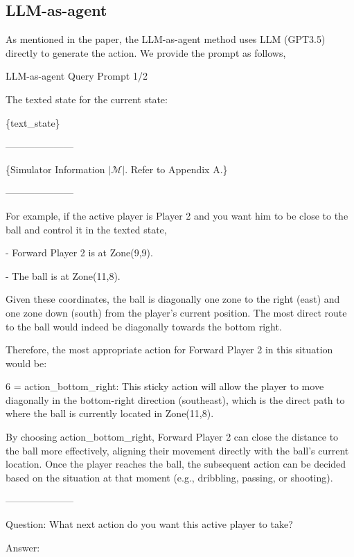\subsection{LLM-as-agent}
As mentioned in the paper, the LLM-as-agent method uses LLM (GPT3.5) directly to generate the action. We provide the prompt as follows,
\begin{gbox}{LLM-as-agent Query Prompt 1/2}

The texted state for the current state:

\{text\_state\}



---------------------



\{Simulator Information $|\mathcal{M}|$. Refer to Appendix A.\}




---------------------

\hspace{5mm}


For example, if the active player is Player 2 and you want him to be close to the ball and control it in the texted state, 

\hspace{5mm}

- Forward Player 2 is at Zone(9,9).


- The ball is at Zone(11,8).

\hspace{5mm}

Given these coordinates, the ball is diagonally one zone to the right 
(east) and one zone down (south) from the player's current position. 
The most direct route to the ball would indeed 
be diagonally towards the bottom right. 

\hspace{5mm}

Therefore, the most appropriate action for 
Forward Player 2 in this situation would be: 

\hspace{5mm}

6 = action\_bottom\_right: This sticky action will allow the player to
move diagonally in the bottom-right direction (southeast), 
which is the direct path to where the ball is currently located in Zone(11,8).



By choosing action\_bottom\_right, Forward Player 2 can close the distance to the ball more effectively, aligning their movement directly with the ball's current location. Once the player reaches the ball, the subsequent action can be decided based on the situation at that moment (e.g., dribbling, passing, or shooting).

\hspace{5mm}

---------------------
\hspace{5mm}

Question: What next action do you want this active player to take?  


Answer:       



\end{gbox}


